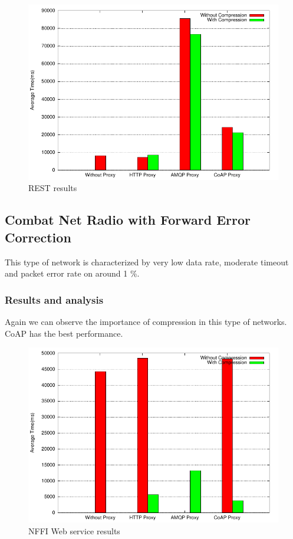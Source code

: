 \begin{figure}[H]
\center
\includegraphics[scale=0.75]{../results/wifi2/rest/result.pdf}
\caption{REST results}
\end{figure}

\subsection{Combat Net Radio with Forward Error Correction}

This type of network is characterized by very low data rate, moderate timeout
and packet error rate on around 1 \%.


\subsubsection{Results and analysis}

Again we can observe the importance of compression in this type of networks.
CoAP has the best performance.

\begin{figure}[H]
\center
\includegraphics[scale=0.75]{../results/cnr/nffi/result.pdf}
\caption{NFFI Web service results}
\end{figure}

